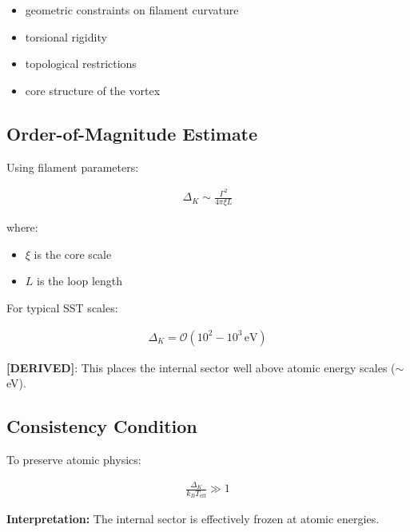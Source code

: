 \documentclass[11pt]{article}
\theoremstyle{definition}
\theoremstyle{plain}
\theoremstyle{remark}
\begin{document}
        \begin{itemize}
            \item geometric constraints on filament curvature
            \item torsional rigidity
            \item topological restrictions
            \item core structure of the vortex
        \end{itemize}
    
    \subsection{Order-of-Magnitude Estimate}
        
        Using filament parameters:
        
        \begin{align}
            \Delta_K \sim \frac{\Gamma^2}{4\pi \xi L}
        \end{align}
        
        where:
        \begin{itemize}
            \item $\xi$ is the core scale
            \item $L$ is the loop length
        \end{itemize}
        
        For typical SST scales:
        
        \begin{align}
            \Delta_K = \mathcal{O}(10^2 - 10^3 \, \text{eV})
        \end{align}
        
        \textbf{[DERIVED]}:
        This places the internal sector well above atomic energy scales ($\sim$ eV).
    
    \subsection{Consistency Condition}
        
        To preserve atomic physics:
        
        \begin{align}
            \frac{\Delta_K}{k_B T_{\text{eff}}} \gg 1
        \end{align}
        
        \textbf{Interpretation:}
        The internal sector is effectively frozen at atomic energies.
    
\end{document}
